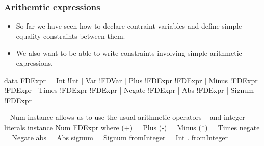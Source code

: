 \documentclass[aspectratio=169,hyphens]{beamer} %
\begin{document}
\begin{frame}[fragile]
    \frametitle{Arithemtic expressions}
    \begin{itemize}
        \item So far we have seen how to declare contraint variables and define simple equality constraints
            between them.
        \item We also want to be able to write constraints involving simple arithmetic expressions.
    \end{itemize}
\end{frame}
\begin{frame}[fragile]
    \begin{code}
data FDExpr
    = Int !Int
    | Var !FDVar
    | Plus !FDExpr !FDExpr
    | Minus !FDExpr !FDExpr
    | Times !FDExpr !FDExpr
    | Negate !FDExpr
    | Abs !FDExpr
    | Signum !FDExpr

-- Num instance allows us to use the usual arithmetic operators
-- and integer literals
instance Num FDExpr where
    (+) = Plus
    (-) = Minus
    (*) = Times
    negate = Negate
    abs = Abs
    signum = Signum
    fromInteger = Int . fromInteger
    \end{code}
\end{frame}

\begin{frame}[fragile]
\end{frame}
\end{document}
